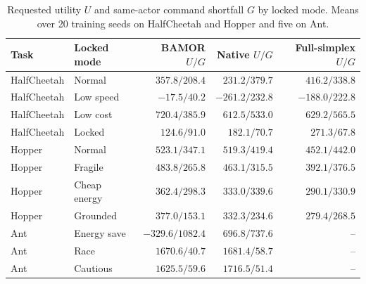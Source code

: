 \begin{table}[!htbp]
\centering\small\setlength{\tabcolsep}{4.5pt}
\caption{Requested utility $U$ and same-actor command shortfall $G$ by locked mode. Means over 20 training seeds on HalfCheetah and Hopper and five on Ant.}
\label{tab:grid_modes}
\begin{tabular}{@{}llrrr@{}}
\toprule
Task & Locked mode & BAMOR $U/G$ & Native $U/G$ & Full-simplex $U/G$ \\
\midrule
HalfCheetah & Normal & $357.8/208.4$ & $231.2/379.7$ & $416.2/338.8$ \\
HalfCheetah & Low speed & $-17.5/40.2$ & $-261.2/232.8$ & $-188.0/222.8$ \\
HalfCheetah & Low cost & $720.4/385.9$ & $612.5/533.0$ & $629.2/565.5$ \\
HalfCheetah & Locked & $124.6/91.0$ & $182.1/70.7$ & $271.3/67.8$ \\
Hopper & Normal & $523.1/347.1$ & $519.3/419.4$ & $452.1/442.0$ \\
Hopper & Fragile & $483.8/265.8$ & $463.1/315.5$ & $392.1/376.5$ \\
Hopper & Cheap energy & $362.4/298.3$ & $333.0/339.6$ & $290.1/330.9$ \\
Hopper & Grounded & $377.0/153.1$ & $332.3/234.6$ & $279.4/268.5$ \\
Ant & Energy save & $-329.6/1082.4$ & $696.8/737.6$ & -- \\
Ant & Race & $1670.6/40.7$ & $1681.4/58.7$ & -- \\
Ant & Cautious & $1625.5/59.6$ & $1716.5/51.4$ & -- \\
\bottomrule
\end{tabular}
\end{table}
